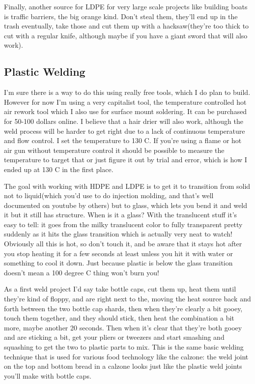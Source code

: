 Finally, another source for LDPE for very large scale projects like
building boats is traffic barriers, the big orange kind. Don't steal
them, they'll end up in the trash eventually, take those and cut them up
with a hacksaw(they're too thick to cut with a regular knife, although
maybe if you have a giant sword that will also work).

\subsection{Plastic Welding}\label{plastic-welding}

I'm sure there is a way to do this using really free tools, which I do
plan to build. However for now I'm using a very capitalist tool, the
temperature controlled hot air rework tool which I also use for surface
mount soldering. It can be purchased for 50-100 dollars online. I
believe that a hair drier will also work, although the weld process will
be harder to get right due to a lack of continuous temperature and flow
control. I set the temperature to 130 C. If you're using a flame or hot
air gun without temperature control it should be possible to measure the
temperature to target that or just figure it out by trial and error,
which is how I ended up at 130 C in the first place.

The goal with working with HDPE and LDPE is to get it to transition from
solid not to liquid(which you'd use to do injection molding, and that's
well documented on youtube by others) but to glass, which lets you bend
it and weld it but it still has structure. When is it a glass? With the
translucent stuff it's easy to tell: it goes from the milky translucent
color to fully transparent pretty suddenly as it hits the glass
transition which is actually very neat to watch! Obviously all this is
hot, so don't touch it, and be aware that it stays hot after you stop
heating it for a few seconds at least unless you hit it with water or
something to cool it down. Just because plastic is below the glass
transition doesn't mean a 100 degree C thing won't burn you!

As a first weld project I'd say take bottle caps, cut them up, heat them
until they're kind of floppy, and are right next to the, moving the heat
source back and forth between the two bottle cap shards, then when
they're clearly a bit gooey, touch them together, and they should stick,
then heat the combination a bit more, maybe another 20 seconds. Then
when it's clear that they're both gooey and are sticking a bit, get your
pliers or tweezers and start smashing and squashing to get the two to
plastic parts to mix. This is the same basic welding technique that is
used for various food technology like the calzone: the weld joint on the
top and bottom bread in a calzone looks just like the plastic weld
joints you'll make with bottle caps.

